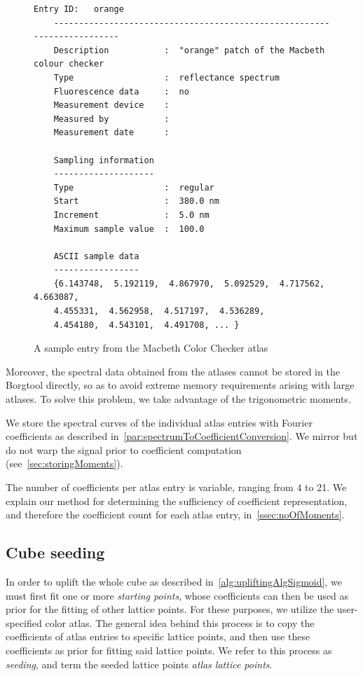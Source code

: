 \begin{figure}
	\begin{lstlisting}[label=lst:atlasEntry]
	Entry ID:   orange
	------------------------------------------------------------------------
	Description           :  "orange" patch of the Macbeth colour checker
	Type                  :  reflectance spectrum
	Fluorescence data     :  no
	Measurement device    :  
	Measured by           :  
	Measurement date      :  
	
	Sampling information
	--------------------
	Type	    	      :  regular
	Start                 :  380.0 nm
	Increment             :  5.0 nm
	Maximum sample value  :  100.0
	
	ASCII sample data
	-----------------
	{6.143748,  5.192119,  4.867970,  5.092529,  4.717562,  4.663087, 
	4.455331,  4.562958,  4.517197,  4.536289,
	4.454180,  4.543101,  4.491708, ... }
	\end{lstlisting}
	\caption{A sample entry from the Macbeth Color Checker atlas}
	\label{fig:macbethSampleText}
\end{figure}

Moreover, the spectral data obtained from the atlases cannot be stored in the Borgtool directly, so as to avoid extreme memory requirements arising with large atlases. To solve this problem, we take advantage of the trigonometric moments.

We store the spectral curves of the individual atlas entries with Fourier coefficients as described in~\cref{par:spectrumToCoefficientConversion}. We mirror but do not warp the signal prior to coefficient computation (see~\cref{sec:storingMoments}).

The number of coefficients per atlas entry is variable, ranging from 4 to 21. We explain our method for determining the sufficiency of coefficient representation, and therefore the coefficient count for each atlas entry, in~\cref{ssec:noOfMoments}.

\subsection{Cube seeding} \label{ssec:cubeSeeding}

In order to uplift the whole cube as described in~\cref{alg:upliftingAlgSigmoid}, we must first fit one or more \emph{starting points}, whose coefficients can then be used as prior for the fitting of other lattice points. For these purposes, we utilize the user-specified color atlas. The general idea behind this process is to copy the coefficients of atlas entries to specific lattice points, and then use these coefficients as prior for fitting said lattice points. We refer to this process as \emph{seeding}, and term the seeded lattice points \emph{atlas lattice points}.

